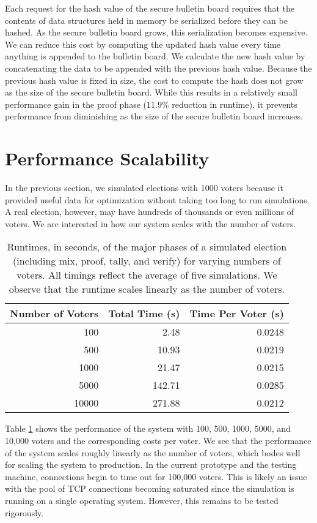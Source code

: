 Each request for the hash value of the secure bulletin board requires that the contents of data structures held in memory be serialized before they can be hashed. As the secure bulletin board grows, this serialization becomes expensive. We can reduce this cost by computing the updated hash value every time anything is appended to the bulletin board. We calculate the new hash value by concatenating the data to be appended with the previous hash value. Because the previous hash value is fixed in size, the cost to compute the hash does not grow as the size of the secure bulletin board. While this results in a relatively small performance gain in the proof phase ($11.9\%$ reduction in runtime), it prevents performance from diminishing as the size of the secure bulletin board increases.

\section{Performance Scalability} \label{perf:scale}

In the previous section, we simulated elections with 1000 voters because it provided useful data for optimization without taking too long to run simulations. A real election, however, may have hundreds of thousands or even millions of voters. We are interested in how our system scales with the number of voters.

\begin{table}[htbp]
\centering
\begin{tabular}{r | r | r}
  \textbf{Number of Voters} & \textbf{Total Time (s)} & \textbf{Time Per Voter (s)} \\
  \hline
  100 & 2.48 & 0.0248 \\
  500 & 10.93 & 0.0219 \\
  1000 & 21.47 & 0.0215 \\
  5000 & 142.71 & 0.0285 \\
  10000 & 271.88 & 0.0212
\end{tabular}
\caption[Election runtime for varying numbers of voters]{Runtimes, in seconds, of the major phases of a simulated election (including mix, proof, tally, and verify) for varying numbers of voters. All timings reflect the average of five simulations. We observe that the runtime scales linearly as the number of voters.}
\label{perf:nvoters}
\end{table}

Table \ref{perf:nvoters} shows the performance of the system with 100, 500, 1000, 5000, and 10,000 voters and the corresponding costs per voter. We see that the performance of the system scales roughly linearly as the number of voters, which bodes well for scaling the system to production. In the current prototype and the testing machine, connections begin to time out for 100,000 voters. This is likely an issue with the pool of TCP connections becoming saturated since the simulation is running on a single operating system. However, this remains to be tested rigorously.

